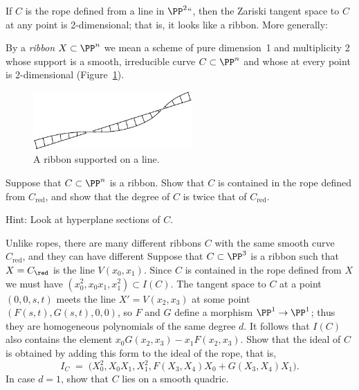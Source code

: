 If $C$ is the rope defined from a line in $\PP^2` `$, then the Zariski
tangent space to $C$ at
any point is 2-dimensional; that is, it looks like a ribbon. More
generally:

\begin{definition}
By a \emph{ribbon} $X \subset \PP^n$ we mean a scheme of pure dimension~1
%
and multiplicity 2 whose support is a smooth, irreducible curve $C \subset
\PP^n$ and whose 
%
 at every point is 2-dimensional
(Figure~\ref{Fig15.3}).
\begin{figure}
\vskip-5pt
\centerline {\includegraphics[width=2.4in]{"main/Fig15-3"}}
\vskip-8pt
\caption{A ribbon supported on a line.}
\label{Fig15.3}
\end{figure}
\end{definition}

\begin{exercise}
Suppose that $C\subset \PP^n$ is a ribbon. Show that $C$ is
contained in the rope defined from $C_{\mathrm{red}}$, and show that
the degree of $C$ is twice 
that
of $C_{\mathrm{red}}$.

Hint: Look at hyperplane sections of $C$.
\end{exercise}

Unlike ropes, there are many different ribbons $C$ with the same smooth
curve $C_{\mathrm{red}}$,
and they can have different 
%
Suppose that $C\subset \PP^3$ is a ribbon such that $X = C_{\red}$
is the line $V(x_0,x_1)$.
Since $C$ is contained in the rope defined from $X$ we must have
$(x_0^2, x_0x_1,x_1^2) \subset I(C)$. The tangent space to $C$ at a
point $(0,0,s,t)$ meets the line $X' = V(x_2, x_3)$
at some point $(F(s,t),G(s,t),0,0)$, so $F$ and $G$ define a morphism
$\PP^1 \to \PP^1$;
thus they are homogeneous polynomials of the same degree $d$. It follows
that $I(C)$ also contains the element
$x_0 G(x_2, x_3) - x_1F(x_2,x_3)$. Show that the ideal of $C$ is obtained
by adding this form to the ideal of the rope, that is,
$$
I_C \; = \; \big(X_0^2, X_0X_1, X_1^2, F(X_3,X_4)X_0 + G(X_3,X_4)X_1\big)
.
$$
In case $d=1$, show that $C$ lies on a smooth quadric.

\subsection*{
}

